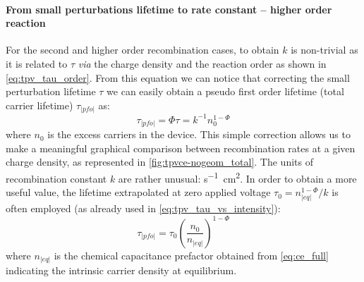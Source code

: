 		\paragraph{From small perturbations lifetime to rate constant -- higher order reaction}
		For the second and higher order recombination cases, to obtain $k$ is non\hyp{}trivial as it is related to $\tau$ \textsl{via} the charge density \cite{ORegan2007} and the reaction order \cite{Shuttle2008,Du2018,Barnes2011,Barnes2011a} as shown in \cref{eq:tpv_tau_order}.
		From this equation we can notice that correcting the small perturbation lifetime $\tau$ we can easily obtain a pseudo first order lifetime (total carrier lifetime) $\tau_|pfo|$ as:
		\begin{equation}\label{eq:tau_pfo}
			\tau_|pfo| = \Phi \tau = k^{-1} n_0^{1-\Phi}
		\end{equation}
		where $n_0$ is the excess carriers in the device.
		This simple correction allows us to make a meaningful graphical comparison between recombination rates at a given charge density, as represented in \cref{fig:tpvce-nogeom_total}.
		The units of recombination constant $k$ are rather unusual: \si{\s^{-1}.\cm^{2}}.
		In order to obtain a more useful value, the lifetime extrapolated at zero applied voltage $\tau_0=n_|eq|^{1-\Phi}/k$ is often employed \cite{Kirchartz2012,Du2018,Kiermasch2019,Wheeler2017} (as already used in \cref{eq:tpv_tau_vs_intensity}):
		\begin{equation}\label{eq:tau_pfo_neq}
			\tau_|pfo| = \tau_0 \left(\frac{n_0}{n_|eq|}\right)^{1-\Phi}
		\end{equation}
		where $n_|eq|$ is the chemical capacitance prefactor obtained from \cref{eq:ce_full} indicating the intrinsic carrier density at equilibrium.


